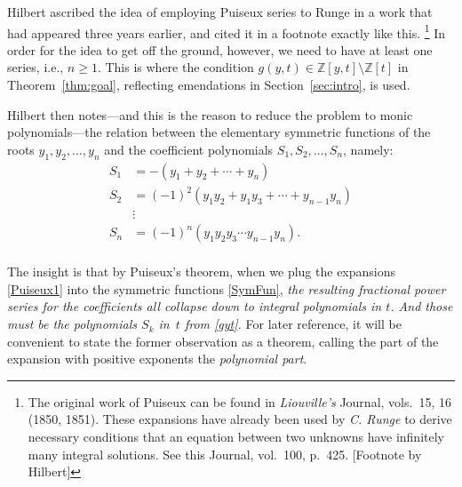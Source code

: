 \documentclass{article}
\theoremstyle{plain}
\theoremstyle{definition}
\renewcommand{\geq}{\geqslant}  %
\newcommand{\Zed}{\mathbb{Z}}   %
\begin{document}
Hilbert \cite{Hilbert1892} ascribed the idea of employing Puiseux series to Runge in a work that had appeared
three years earlier, and cited it in a footnote exactly like this.%
% 
\footnote{The original work of Puiseux can be found in
\emph{Liouville's} Journal, vols.~15, 16 (1850, 1851). These
expansions have already been used by \emph{C. Runge} to derive
necessary conditions that an equation between two unknowns have
infinitely many integral solutions. See this Journal, vol.~100,
p.~425.
[Footnote by Hilbert]}
% 
In order for the idea to get off the ground, however, we need to have at least one series, i.e., $n \geq 1$.  This is where the condition $g(y,t) \in \Zed[y,t] \setminus \Zed[t]$ in Theorem~\ref{thm:goal}, reflecting emendations in Section~\ref{sec:intro}, is used.

Hilbert then notes---and this is the reason to reduce the problem to monic
polynomials---the relation between the elementary symmetric functions
of the roots $y_1,y_2,\dots,y_n$ and the coefficient polynomials
$S_1,S_2,\ldots,S_n$, namely:
\begin{equation}
\label{SymFun} %
\begin{split}
S_1 &= -(y_1 + y_2 +\cdots+ y_n)
\\
S_2 &= (-1)^2(y_1y_2 + y_1y_3 +\cdots+ y_{n-1}y_n)
\\
&\vdots
\\
S_n &= (-1)^n(y_1y_2y_3\cdots y_{n-1}y_n).\\
\end{split}
\end{equation}


The insight is that by Puiseux's theorem, when we plug the expansions
\eqref{Puiseux1} into the symmetric functions \eqref{SymFun},
\emph{the resulting fractional power series for the coefficients all
collapse down to 
integral polynomials in $t$.  And those must be the polynomials $S_k$ in~$t$ from \eqref{gyt}.}
For later reference, it will be convenient to state 
the former observation as a theorem, calling the part of
the expansion with positive exponents the \emph{polynomial part}.
\end{document}
